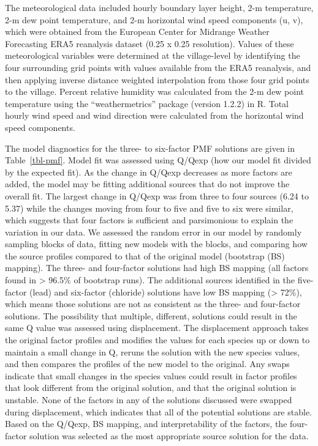 \documentclass[
  letterpaper,
  DIV=11,
  numbers=noendperiod]{scrartcl}
\begin{document}
The meteorological data included hourly boundary layer height, 2-m
temperature, 2-m dew point temperature, and 2-m horizontal wind speed
components (u, v), which were obtained from the European Center for
Midrange Weather Forecasting ERA5 reanalysis dataset (0.25 x 0.25
resolution). Values of these meteorological variables were determined at
the village-level by identifying the four surrounding grid points with
values available from the ERA5 reanalysis, and then applying inverse
distance weighted interpolation from those four grid points to the
village. Percent relative humidity was calculated from the 2-m dew point
temperature using the ``weathermetrics'' package (version 1.2.2) in R.
Total hourly wind speed and wind direction were calculated from the
horizontal wind speed components.

The model diagnostics for the three- to six-factor PMF solutions are
given in Table~\ref{tbl-pmf}. Model fit was assessed using Q/Qexp (how
our model fit divided by the expected fit). As the change in Q/Qexp
decreases as more factors are added, the model may be fitting additional
sources that do not improve the overall fit. The largest change in
Q/Qexp was from three to four sources (6.24 to 5.37) while the changes
moving from four to five and five to six were similar, which suggests
that four factors is sufficient and parsimonious to explain the
variation in our data. We assessed the random error in our model by
randomly sampling blocks of data, fitting new models with the blocks,
and comparing how the source profiles compared to that of the original
model (bootstrap (BS) mapping). The three- and four-factor solutions had
high BS mapping (all factors found in \textgreater{} 96.5\% of bootstrap
runs). The additional sources identified in the five-factor (lead) and
six-factor (chloride) solutions have low BS mapping (\textgreater{}
72\%), which means those solutions are not as consistent as the three-
and four-factor solutions. The possibility that multiple, different,
solutions could result in the same Q value was assessed using
displacement. The displacement approach takes the original factor
profiles and modifies the values for each species up or down to maintain
a small change in Q, reruns the solution with the new species values,
and then compares the profiles of the new model to the original. Any
swaps indicate that small changes in the species values could result in
factor profiles that look different from the original solution, and that
the original solution is unstable. None of the factors in any of the
solutions discussed were swapped during displacement, which indicates
that all of the potential solutions are stable. Based on the Q/Qexp, BS
mapping, and interpretability of the factors, the four-factor solution
was selected as the most appropriate source solution for the data.
\end{document}
